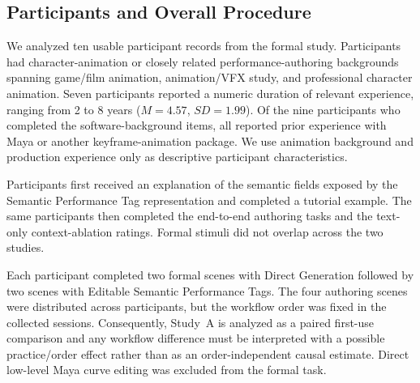 
\subsection{Participants and Overall Procedure}
\label{sec:eval_participants}

We analyzed ten usable participant records from the formal study.
Participants had character-animation or closely related performance-authoring
backgrounds spanning game/film animation, animation/VFX study, and professional
character animation. Seven participants reported a numeric duration of relevant
experience, ranging from 2 to 8 years ($M=4.57$, $SD=1.99$). Of the nine
participants who completed the software-background items, all reported prior
experience with Maya or another keyframe-animation package. We use animation
background and production experience only as descriptive participant
characteristics.

Participants first received an explanation of the semantic fields exposed by
the Semantic Performance Tag representation and completed a tutorial example.
The same participants then completed the end-to-end authoring tasks and the
text-only context-ablation ratings. Formal stimuli did not overlap across the
two studies.


Each participant completed two formal scenes with Direct Generation followed by
two scenes with Editable Semantic Performance Tags. The four authoring scenes
were distributed across participants, but the workflow order was fixed in the
collected sessions. Consequently, Study~A is analyzed as a paired first-use
comparison and any workflow difference must be interpreted with a possible
practice/order effect rather than as an order-independent causal estimate.
Direct low-level Maya curve editing was excluded from the formal task.

